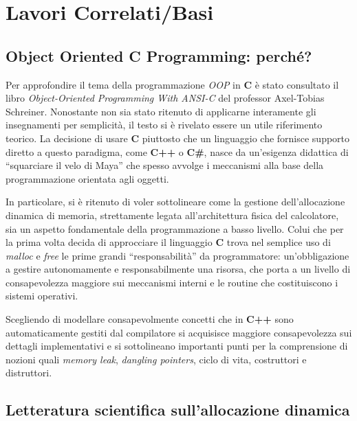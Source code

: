 \chapter{Lavori Correlati/Basi}
\section{Object Oriented C Programming: perché?}

Per approfondire il tema della programmazione \textit{OOP} in \textbf{C} è stato consultato il libro \textit{Object-Oriented Programming With ANSI-C} del professor Axel-Tobias Schreiner. Nonostante non sia stato ritenuto di applicarne interamente gli insegnamenti per semplicità, il testo si è rivelato essere un utile riferimento teorico. La decisione di usare \textbf{C} piuttosto che un linguaggio che fornisce supporto diretto a questo paradigma, come \textbf{C++} o \textbf{C\#}, nasce da un’esigenza didattica di ``squarciare il velo di Maya'' che spesso avvolge i meccanismi alla base della programmazione orientata agli oggetti.

In particolare, si è ritenuto di voler sottolineare come la gestione dell’allocazione dinamica di memoria, strettamente legata all’architettura fisica del calcolatore, sia un aspetto fondamentale della programmazione a basso livello. Colui che per la prima volta decida di approcciare il linguaggio \textbf{C} trova nel semplice uso di \textit{malloc} e \textit{free} le prime grandi ``responsabilità'' da programmatore: un’obbligazione a gestire autonomamente e responsabilmente una risorsa, che porta a un livello di consapevolezza maggiore sui meccanismi interni e le routine che costituiscono i sistemi operativi.

Scegliendo di modellare consapevolmente concetti che in \textbf{C++} sono automaticamente gestiti dal compilatore si acquisisce maggiore consapevolezza sui dettagli implementativi e si sottolineano importanti punti per la comprensione di nozioni quali \textit{memory leak}, \textit{dangling pointers}, ciclo di vita, costruttori e distruttori.

\section{Letteratura scientifica sull’allocazione dinamica}

